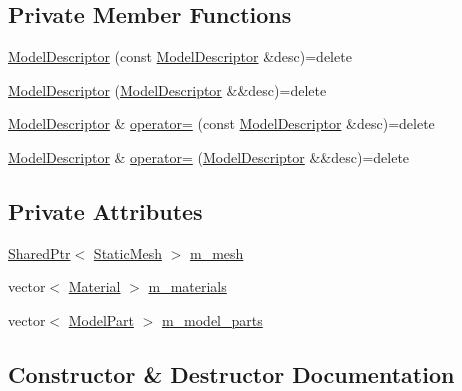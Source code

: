 \subsection*{Private Member Functions}
\begin{DoxyCompactItemize}
\item 
\hyperlink{classmage_1_1_model_descriptor_af44185efc20e10ede762d29bc454c5f3}{Model\+Descriptor} (const \hyperlink{classmage_1_1_model_descriptor}{Model\+Descriptor} \&desc)=delete
\item 
\hyperlink{classmage_1_1_model_descriptor_a0b9c94c989ef70b6149a571106a1a73c}{Model\+Descriptor} (\hyperlink{classmage_1_1_model_descriptor}{Model\+Descriptor} \&\&desc)=delete
\item 
\hyperlink{classmage_1_1_model_descriptor}{Model\+Descriptor} \& \hyperlink{classmage_1_1_model_descriptor_a734b17224719896921e9f6252ee88483}{operator=} (const \hyperlink{classmage_1_1_model_descriptor}{Model\+Descriptor} \&desc)=delete
\item 
\hyperlink{classmage_1_1_model_descriptor}{Model\+Descriptor} \& \hyperlink{classmage_1_1_model_descriptor_ae2ae685569c0ae534d9f0b5622a807d0}{operator=} (\hyperlink{classmage_1_1_model_descriptor}{Model\+Descriptor} \&\&desc)=delete
\end{DoxyCompactItemize}
\subsection*{Private Attributes}
\begin{DoxyCompactItemize}
\item 
\hyperlink{namespacemage_a1e01ae66713838a7a67d30e44c67703e}{Shared\+Ptr}$<$ \hyperlink{classmage_1_1_static_mesh}{Static\+Mesh} $>$ \hyperlink{classmage_1_1_model_descriptor_ac3935d5b0738860809a770403ed07480}{m\+\_\+mesh}
\item 
vector$<$ \hyperlink{structmage_1_1_material}{Material} $>$ \hyperlink{classmage_1_1_model_descriptor_a672238b257f99836243d84f634ffeea2}{m\+\_\+materials}
\item 
vector$<$ \hyperlink{structmage_1_1_model_part}{Model\+Part} $>$ \hyperlink{classmage_1_1_model_descriptor_a200c6e44c9b6a5bde5c8490fb93ba00f}{m\+\_\+model\+\_\+parts}
\end{DoxyCompactItemize}


\subsection{Constructor \& Destructor Documentation}
\hypertarget{classmage_1_1_model_descriptor_a1ae1d85907be96350cef77e6a4ba4fb9}{}\label{classmage_1_1_model_descriptor_a1ae1d85907be96350cef77e6a4ba4fb9} 
